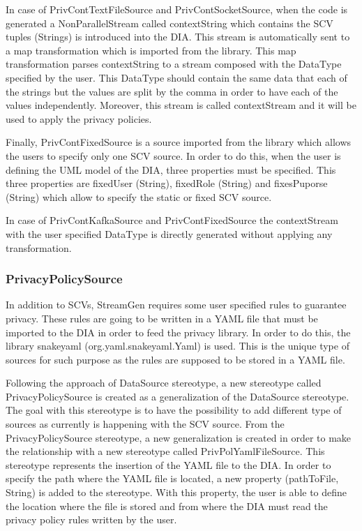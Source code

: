 In case of PrivContTextFileSource and PrivContSocketSource, when the code is generated a NonParallelStream called contextString which contains the SCV tuples (Strings) is introduced into the DIA. This stream is automatically sent to a map transformation which is imported from the library. This map transformation parses contextString to a stream composed with the DataType specified by the user. This DataType should contain the same data that each of the strings but the values are split by the comma in order to have each of the values independently. Moreover, this stream is called contextStream and it will be used to apply the privacy policies.

Finally, PrivContFixedSource is a source imported from the library which allows the users to specify only one SCV source. In order to do this, when the user is defining the UML model of the DIA, three properties must be specified. This three properties are fixedUser (String), fixedRole (String) and fixesPuporse (String) which allow to specify the static or fixed SCV source.

In case of PrivContKafkaSource and PrivContFixedSource the contextStream with the user specified DataType is directly generated without applying any transformation.

\subsubsection{PrivacyPolicySource}

In addition to SCVs, StreamGen requires some user specified rules to guarantee privacy. These rules are going to be written in a YAML file that must be imported to the DIA in order to feed the privacy library. In order to do this, the library snakeyaml (org.yaml.snakeyaml.Yaml) is used. This is the unique type of sources for such purpose as the rules are supposed to be stored in a YAML file.

Following the approach of DataSource stereotype, a new stereotype called PrivacyPolicySource is created as a generalization of the DataSource stereotype. The goal with this stereotype is to have the possibility to add different type of sources as currently is happening with the SCV source. From the PrivacyPolicySource stereotype, a new generalization is created in order to make the relationship with a new stereotype called PrivPolYamlFileSource. This stereotype represents the insertion of the YAML file to the DIA. In order to specify the path where the YAML file is located, a new property (pathToFile, String) is added to the stereotype. With this property, the user is able to define the location where the file is stored and from where the DIA must read the privacy policy rules written by the user.

